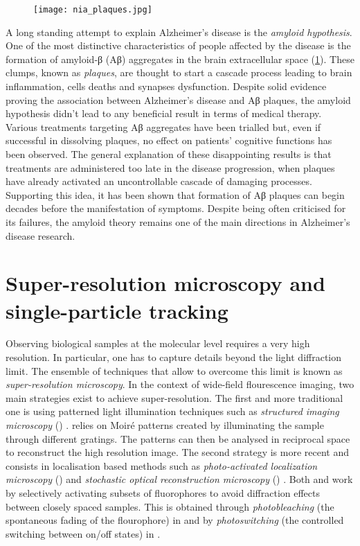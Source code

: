 \begin{figure}
  \label{fig:plaques}
  \texttt{[image: nia\_plaques.jpg]}
\end{figure}

A long standing attempt to explain Alzheimer’s disease is the \emph{amyloid hypothesis}. One of the most distinctive characteristics of people affected by the disease is the formation of amyloid-β (Aβ) aggregates in the brain extracellular space (\cref{fig:plaques}).
These clumps, known as \emph{plaques}, are thought to start a cascade process leading to brain inflammation, cells deaths and synapses dysfunction. Despite solid evidence proving the association between Alzheimer's disease and Aβ plaques, the amyloid hypothesis didn't lead to any beneficial result in terms of medical therapy. Various treatments targeting Aβ aggregates have been trialled but, even if successful in dissolving plaques, no effect on patients' cognitive functions has been observed. The general explanation of these disappointing results is that treatments are administered too late in the disease progression, when plaques have already activated an uncontrollable cascade of damaging processes. Supporting this idea, it has been shown that formation of Aβ plaques can begin decades before the manifestation of symptoms. Despite being often criticised for its failures, the amyloid theory remains one of the main directions in Alzheimer's disease research.



\section{Super-resolution microscopy and single-particle tracking}

Observing biological samples at the molecular level requires a very high resolution. In particular, one has to capture details beyond the light diffraction limit. The ensemble of techniques that allow to overcome this limit is known as \emph{super-resolution microscopy}. In the context of wide-field flourescence imaging, two main strategies exist to achieve super-resolution. The first and more traditional one is using patterned light illumination techniques such as \emph{structured imaging microscopy} () .  relies on Moiré patterns created by illuminating the sample through different gratings. The patterns can then be analysed in reciprocal space to reconstruct the high resolution image. The second strategy is more recent and consists in localisation based methods such as \emph{photo-activated localization microscopy} ()  and \emph{stochastic optical reconstruction microscopy} () . Both  and  work by selectively activating subsets of fluorophores to avoid diffraction effects between closely spaced samples. This is obtained through \emph{photobleaching} (the spontaneous fading of the flourophore) in  and by \emph{photoswitching} (the controlled switching between on/off states) in .

